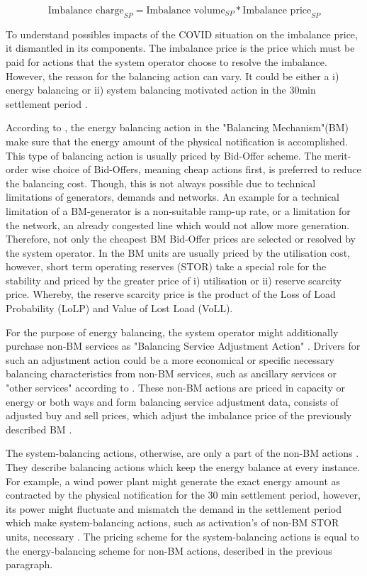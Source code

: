 \documentclass[energies,article,submit,moreauthors,pdftex]{Definitions/mdpi}
\begin{document}
\[ \text{Imbalance charge}_{SP} = \text{Imbalance volume}_{SP} * \text{Imbalance price}_{SP} \]

To understand possibles impacts of the COVID situation on the imbalance price, it dismantled in its components. The imbalance price is the price which must be paid for actions that the system operator choose to resolve the imbalance. However, the reason for the balancing action can vary. It could be either a i) energy balancing or ii) system balancing motivated action in the 30min settlement period \cite{ELEXON2019GuidanceBritain}. 

According to \cite{ELEXON2019GuidanceBritain}, the energy balancing action in the "Balancing Mechanism"(BM) make sure that the energy amount of the physical notification is accomplished. This type of balancing action is usually priced by Bid-Offer scheme. The merit-order wise choice of Bid-Offers, meaning cheap actions first, is preferred to reduce the balancing cost. Though, this is not always possible due to technical limitations of generators, demands and networks. An example for a technical limitation of a BM-generator is a non-suitable ramp-up rate, or a limitation for the network, an already congested line which would not allow more generation. Therefore, not only the cheapest BM Bid-Offer prices are selected or resolved by the system operator. In the BM units are usually priced by the utilisation cost, however, short term operating reserves (STOR) take a special role for the stability and priced by the greater price of i) utilisation or ii) reserve scarcity price. Whereby, the reserve scarcity price is the product of the Loss of Load Probability (LoLP) and Value of Lost Load (VoLL). 

For the purpose of energy balancing, the system operator might additionally purchase non-BM services as "Balancing Service Adjustment Action" \cite{Nationalgrid2017ProcurementSO}. Drivers for such an adjustment action could be a more economical or specific necessary balancing characteristics from non-BM services, such as ancillary services or "other services" according to \cite{Nationalgrid2018BalancingStatement}. These non-BM actions are priced in capacity or energy or both ways and form balancing service adjustment data, consists of adjusted buy and sell prices, which adjust the imbalance price of the previously described BM \cite{Nationalgrid2017ProcurementSO,Nationalgrid2018BalancingStatement}.

The system-balancing actions, otherwise, are only a part of the non-BM actions \cite{Nationalgrid2018BalancingStatement}. They describe balancing actions which keep the energy balance at every instance. For example, a wind power plant might generate the exact energy amount as contracted by the physical notification for the 30 min settlement period, however, its power might fluctuate and mismatch the demand in the settlement period which make system-balancing actions, such as activation's of non-BM STOR units, necessary \cite{Nationalgrid2018BalancingStatement}. The pricing scheme for the system-balancing actions is equal to the energy-balancing scheme for non-BM actions, described in the previous paragraph.  
\end{document}
